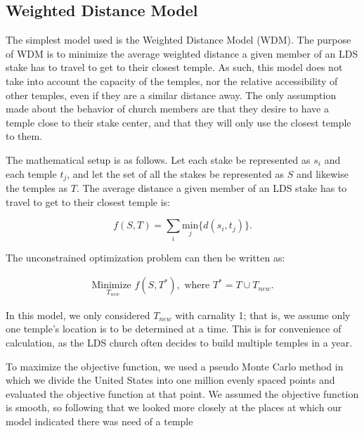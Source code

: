 \documentclass[twoside,twocolumn]{article}
\begin{document}
\subsection{Weighted Distance Model} 

The simplest model used is the Weighted Distance Model (WDM).
The purpose of WDM is to minimize the average weighted distance a given member of an LDS stake has to travel to get to their closest temple.%
As such, this model does not take into account the capacity of the temples, nor the relative accessibility of other temples, even if they are a similar distance away. %
The only assumption made about the behavior of church members are that they desire to have a temple close to their stake center, and that they will only use the closest temple to them.

The mathematical setup is as follows. Let each stake be represented as $s_i$ and each temple $t_j$, and let the set of all the stakes be represented as $S$ and likewise the temples as $T$.
The average distance a given member of an LDS stake has to travel to get to their closest temple is:

\begin{equation}
	f(S,T) = \sum_i \underset{j}{\text{min}}\{d(s_i,t_j)\}.
\end{equation}

The unconstrained optimization problem can then be written as:

\begin{equation}
\begin{aligned}
	\underset{T_{new}}{\text{Minimize }} f(S,T^*), \text{ where } T^* = T \cup T_{new}.
\end{aligned}
\end{equation}

In this model, we only considered $T_{new}$ with carnality 1; that is, we assume only one temple's location is to be determined at a time. 
This is for convenience of calculation, as the LDS church often decides to build multiple temples in a year. %

To maximize the objective function, we used a pseudo Monte Carlo method in which we divide the United States into one million evenly spaced points and evaluated the objective function at that point.
We assumed the objective function is smooth, so following that we looked more closely at the places at which our model indicated there was need of a temple %
\end{document}
